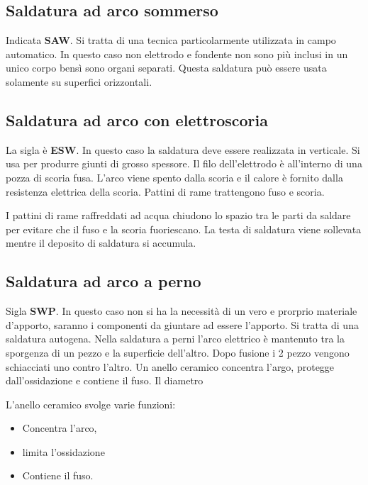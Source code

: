 
\subsection{Saldatura ad arco sommerso}
Indicata \textbf{SAW}.
Si tratta di una tecnica particolarmente utilizzata in campo automatico.
In questo caso non elettrodo e fondente non sono più inclusi in un unico corpo bensì sono organi separati.
Questa saldatura può essere usata solamente su superfici orizzontali.


\subsection{Saldatura ad arco con elettroscoria}
La sigla è \textbf{ESW}.
In questo caso la saldatura deve essere realizzata in verticale.
Si usa per produrre giunti di grosso spessore.
Il filo dell'elettrodo è all'interno di una pozza di scoria fusa.
L'arco viene spento dalla scoria e il calore è fornito dalla resistenza elettrica della scoria.
Pattini di rame trattengono fuso e scoria.

I pattini di rame raffreddati ad acqua chiudono lo spazio tra le parti da saldare per evitare che il fuso e la scoria fuoriescano.
La testa di saldatura viene sollevata mentre il deposito di saldatura si accumula.

\subsection{Saldatura ad arco a perno}
Sigla \textbf{SWP}.
In questo caso non si ha la necessità di un vero e prorprio materiale d'apporto, saranno i componenti da giuntare ad essere l'apporto.
Si tratta di una saldatura autogena.
Nella saldatura a perni l'arco elettrico è mantenuto tra la sporgenza di un pezzo e la superficie dell'altro.
Dopo fusione i 2 pezzo vengono schiacciati uno contro l'altro.
Un anello ceramico concentra l'argo, protegge dall'ossidazione e contiene il fuso.
Il diametro \todo{\\Aggiungi}


L'anello ceramico svolge varie funzioni:
\begin{itemize}
\item Concentra l'arco,
\item limita l'ossidazione 
\item Contiene il fuso.
\end{itemize}

